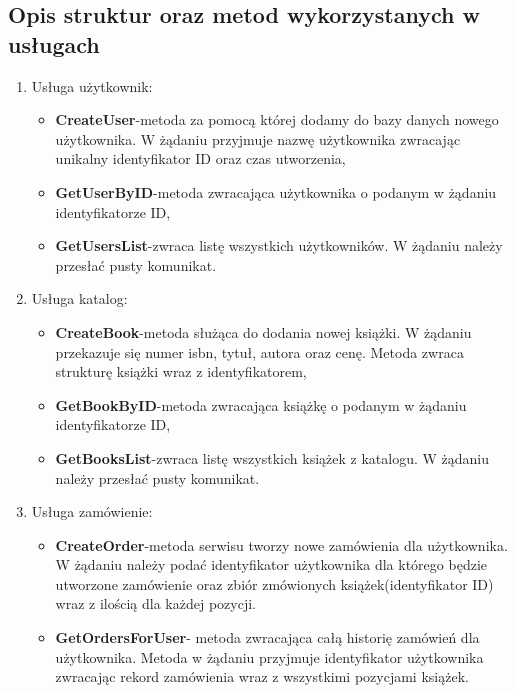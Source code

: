\subsection{Opis struktur oraz metod wykorzystanych w usługach}
\par
\begin{enumerate}
    \item Usługa użytkownik:
          \begin{itemize}
              \item \textbf{CreateUser}-metoda za pomocą której dodamy do bazy danych nowego użytkownika. W żądaniu przyjmuje nazwę użytkownika zwracając unikalny identyfikator ID oraz czas utworzenia,
              \item \textbf{GetUserByID}-metoda zwracająca użytkownika o podanym w żądaniu identyfikatorze ID,
              \item \textbf{GetUsersList}-zwraca listę wszystkich użytkowników. W żądaniu należy przesłać pusty komunikat.
          \end{itemize}
    \item Usługa katalog:
          \begin{itemize}
              \item \textbf{CreateBook}-metoda służąca do dodania nowej książki. W żądaniu przekazuje się numer isbn, tytuł, autora oraz cenę. Metoda zwraca strukturę książki wraz z identyfikatorem,
              \item \textbf{GetBookByID}-metoda zwracająca książkę o podanym w żądaniu identyfikatorze ID,
              \item \textbf{GetBooksList}-zwraca listę wszystkich książek z katalogu. W żądaniu należy przesłać pusty komunikat.
          \end{itemize}
    \item Usługa zamówienie:
          \begin{itemize}
              \item \textbf{CreateOrder}-metoda serwisu tworzy nowe zamówienia dla użytkownika. W żądaniu należy podać identyfikator użytkownika dla którego będzie utworzone zamówienie oraz zbiór zmówionych książek(identyfikator ID) wraz z ilością dla każdej pozycji.
              \item \textbf{GetOrdersForUser}- metoda zwracająca całą historię zamówień dla użytkownika. Metoda w żądaniu
                    przyjmuje identyfikator użytkownika zwracając rekord zamówienia wraz z wszystkimi pozycjami książek.
          \end{itemize}
\end{enumerate}
